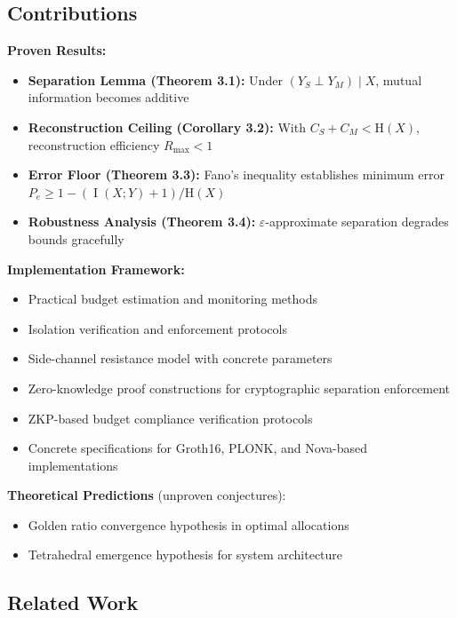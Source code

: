 \documentclass[11pt,a4paper]{article}
\theoremstyle{definition}
\DeclareMathOperator{\I}{I}
\newcommand{\Entropy}{\mathrm{H}}
\newcommand{\given}{\mid}
\newcommand{\indep}{\perp}
\begin{document}
\subsection{Contributions}

\textbf{Proven Results:}

\begin{itemize}
    \item \textbf{Separation Lemma (Theorem 3.1):} Under $(Y_S \indep Y_M) \given X$, mutual information becomes additive
    \item \textbf{Reconstruction Ceiling (Corollary 3.2):} With $C_S + C_M < \Entropy(X)$, reconstruction efficiency $R_{\max} < 1$
    \item \textbf{Error Floor (Theorem 3.3):} Fano's inequality establishes minimum error $P_e \geq 1 - (\I(X;Y) + 1)/\Entropy(X)$
    \item \textbf{Robustness Analysis (Theorem 3.4):} $\varepsilon$-approximate separation degrades bounds gracefully
\end{itemize}

\textbf{Implementation Framework:}

\begin{itemize}
    \item Practical budget estimation and monitoring methods
    \item Isolation verification and enforcement protocols
    \item Side-channel resistance model with concrete parameters
    \item Zero-knowledge proof constructions for cryptographic separation enforcement
    \item ZKP-based budget compliance verification protocols
    \item Concrete specifications for Groth16, PLONK, and Nova-based implementations
\end{itemize}

\textbf{Theoretical Predictions} (unproven conjectures):

\begin{itemize}
    \item Golden ratio convergence hypothesis in optimal allocations
    \item Tetrahedral emergence hypothesis for system architecture
\end{itemize}

\subsection{Related Work}
\end{document}
